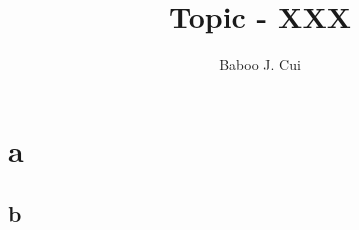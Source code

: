 \documentclass[10pt,a4paper,oneside]{article}
\author{Baboo J. Cui}
\title{Topic - XXX}
\begin{document}
\maketitle
\tableofcontents

\newpage

\section{a}

\subsection{b}
\end{document}
